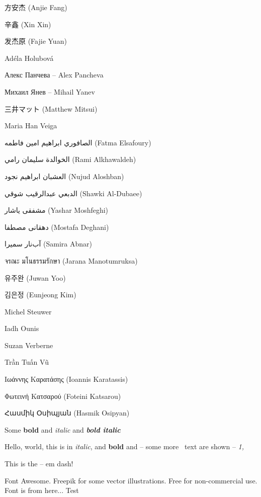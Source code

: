 \begin{preamble}
{\asianfont 方安杰} (Anjie Fang)

{\asianfont 辛鑫} (Xin Xin)

{\asianfont 发杰原} (Fajie Yuan)

Ad\'{e}la Holubov\'{a}

Алекс Панчева -- Alex Pancheva

Михаил Янев -- Mihail Yanev

{\asianfont 三井マット} (Matthew Mitsui)

Maria Han Veiga

{\arabicfont الصافوري ابراهيم امين فاطمه} (Fatma Elsafoury)

{\arabicfont  الخوالدة سليمان رامي} (Rami Alkhawaldeh)

{\arabicfont العشبان ابراهيم نجود} (Nujud Aloshban)

{\arabicfont الدبعي عبدالرقيب شوقي} (Shawki Al-Dubaee)

{\farsifont مشفقى ياشار} (Yashar Moshfeghi)

{\farsifont دهقانی مصطفا} (Mostafa Deghani)

{\farsifont آب‌نار سمیرا} (Samira Abnar)

{\thaifont \Large จรณะ มโนธรรมรักษา} (Jarana Manotumruksa)

{\asianfont 유주완} (Juwan Yoo)

{\asianfont 김은정} (Eunjeong Kim)

Michel Steuwer

Iadh Ounis

Suzan Verberne


Trần Tuấn Vũ

Ιωάννης Καρατάσης (Ioannis Karatassis)

Φωτεινή Κατσαρού (Foteini Katsarou)

{\armenianfont Հասմիկ Օսիպյան} (Hasmik Osipyan)

Some \textbf{bold} and \emph{italic} and \textbf{\emph{bold italic}}

{\metafont Hello, world, this is in \emph{italic}, and \textbf{bold} and -- some more \textemdash~text are shown – \emph{1,}}

This is the -- em \textemdash dash!



\todo{========}
 
Font Awesome. Freepik for some vector illustrations. Free for non-commercial use. Font is from here...
Test


\end{preamble}
